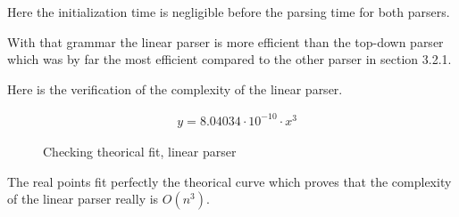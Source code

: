 Here the initialization time is negligible before the parsing time for both parsers.

With that grammar the linear parser is more efficient than the top-down parser which was by far the most efficient compared to the other parser in section 3.2.1.

Here is the verification of the complexity of the linear parser.

\begin{align*}
    &y = 8.04034 \cdot 10^{-10} \cdot x^3
\end{align*}

\FloatBarrier
\begin{figure}[h]
\centering
{}
\caption{Checking theorical fit, linear parser}
\end{figure}
\FloatBarrier

The real points fit perfectly the theorical curve which proves that the complexity of the linear parser really is $O(n^3)$.
